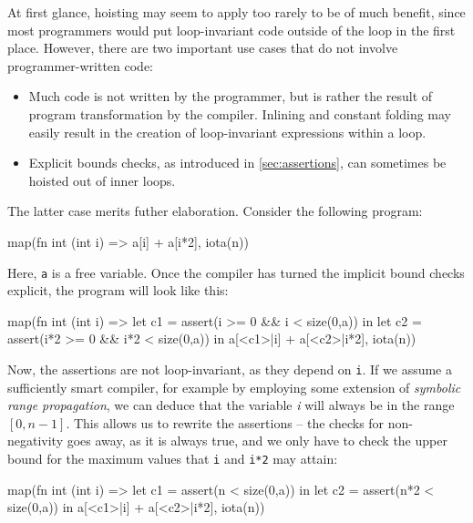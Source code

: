 At first glance, hoisting may seem to apply too rarely to be of much
benefit, since most programmers would put loop-invariant code outside
of the loop in the first place.  However, there are two important use
cases that do not involve programmer-written code:

\begin{itemize}
\item Much \LO{} code is not written by the programmer, but is rather
  the result of program transformation by the compiler.  Inlining and
  constant folding may easily result in the creation of loop-invariant
  expressions within a loop.

\item Explicit bounds checks, as introduced in \cref{sec:assertions},
  can sometimes be hoisted out of inner loops.
\end{itemize}

The latter case merits futher elaboration.  Consider the following
program:

\begin{colorcode}
map(fn int (int i) =>
      a[i] + a[i*2],
    iota(n))
\end{colorcode}

Here, \texttt{a} is a free variable.  Once the compiler has turned the
implicit bound checks explicit, the program will look like this:

\begin{colorcode}
map(fn int (int i) =>
      let c1 = assert(i   >= 0 && i   < size(0,a)) in
      let c2 = assert(i*2 >= 0 && i*2 < size(0,a)) in
      a[<c1>|i] + a[<c2>|i*2],
    iota(n))
\end{colorcode}

Now, the assertions are not loop-invariant, as they depend on
\texttt{i}.  If we assume a sufficiently smart compiler, for example
by employing some extension of \textit{symbolic range
  propagation}\cite{blume1995symbolic}, we can deduce that the
variable \textit{i} will always be in the range $[0,n-1]$.  This
allows us to rewrite the assertions -- the checks for non-negativity
goes away, as it is always true, and we only have to check the upper
bound for the maximum values that \texttt{i} and \texttt{i*2} may
attain:

\begin{colorcode}
map(fn int (int i) =>
      let c1 = assert(n   < size(0,a)) in
      let c2 = assert(n*2 < size(0,a)) in
      a[<c1>|i] + a[<c2>|i*2],
    iota(n))
\end{colorcode}

